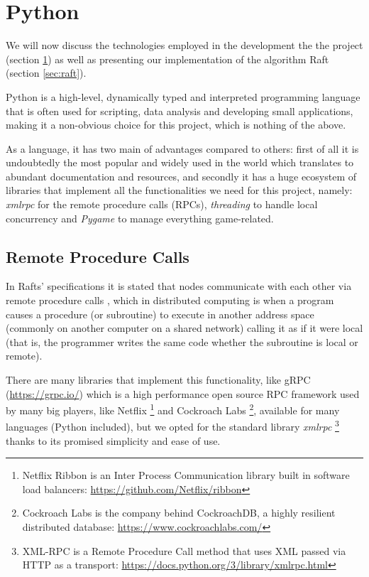 \section{Python} \label{sec:python}

We will now discuss the technologies employed in the development the the project (section \ref{sec:python}) as well as presenting our implementation of the algorithm Raft (section \ref{sec:raft}).

Python is a high-level, dynamically typed and interpreted programming language that is often used for scripting, data analysis and developing small applications, making it a non-obvious choice for this project, which is nothing of the above. 

As a language, it has two main of advantages compared to others: first of all it is undoubtedly the most popular and widely used in the world \cite{tiobe} \cite{ieeeSpect} which translates to abundant documentation and resources, and secondly it has a huge ecosystem of libraries that implement all the functionalities we need for this project, namely: \textit{xmlrpc} for the remote procedure calls (RPCs), \textit{threading} to handle local concurrency and \textit{Pygame} to manage everything game-related.

\subsection{Remote Procedure Calls} \label{sec:xmlrpc}

In Rafts' specifications it is stated that nodes communicate with each other via remote procedure calls \cite{raft}, which in distributed computing is when a program causes a procedure (or subroutine) to execute in another address space (commonly on another computer on a shared network) calling it as if it were local (that is, the programmer writes the same code whether the subroutine is local or remote).

There are many libraries that implement this functionality, like gRPC (\url{https://grpc.io/}) which is a high performance open source RPC framework used by many big players, like Netflix \footnote{Netflix Ribbon is an Inter Process Communication library built in software load balancers: \url{https://github.com/Netflix/ribbon}} and Cockroach Labs \footnote{Cockroach Labs is the company behind CockroachDB, a highly resilient distributed database: \url{https://www.cockroachlabs.com/}}, available for many languages (Python included), but we opted for the standard library \textit{xmlrpc} \footnote{XML-RPC is a Remote Procedure Call method that uses XML passed via HTTP as a transport: \url{https://docs.python.org/3/library/xmlrpc.html}} thanks to its promised simplicity and ease of use. 


